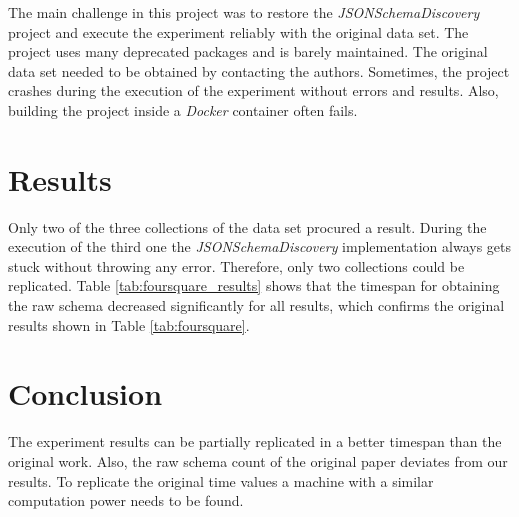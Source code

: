 \documentclass[sigconf, nonacm]{acmart}
\begin{document}
The main challenge in this project was to restore the \textit{JSONSchemaDiscovery} project and execute the experiment reliably with the original data set. The project uses many deprecated packages and is barely maintained. The original data set needed to be obtained by contacting the authors. Sometimes, the project crashes during the execution of the experiment without errors and results. Also, building the project inside a \textit{Docker} container often fails.

\section{Results}

Only two of the three collections of the data set procured a result. During the execution of the third one the \textit{JSONSchemaDiscovery} implementation always gets stuck without throwing any error. Therefore, only two collections could be replicated.
Table \ref{tab:foursquare_results} shows that the timespan for obtaining the raw schema decreased significantly for all results, which confirms the original results shown in Table \ref{tab:foursquare}.

\section{Conclusion}

The experiment results can be partially replicated in a better timespan than the original work. Also, the raw schema count of the original paper deviates from our results. To replicate the original time values a machine with a similar computation power needs to be found.




\end{document}
